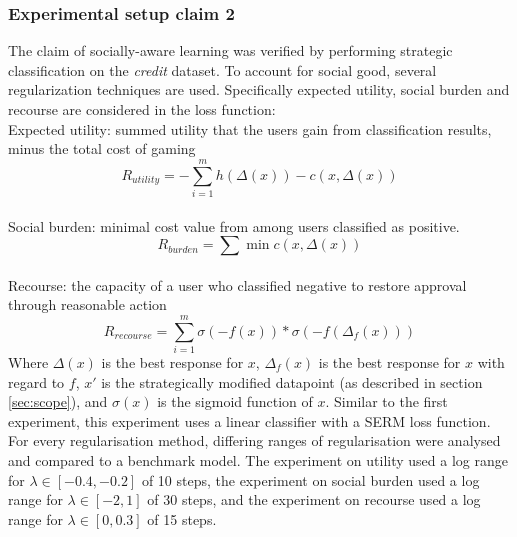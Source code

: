 \subsubsection{Experimental setup claim 2} 
The claim of socially-aware learning was verified by performing strategic classification on the \textit{credit} dataset. To account for social good, several regularization techniques are used. Specifically expected utility, social burden and recourse are considered in the loss function:\\

Expected utility: summed utility that the users gain from classification results, minus the total cost of gaming
\begin{equation}\label{eq:r_util}
     R_{utility} = -\sum^m_{i=1} h(\Delta(x)) - c(x,\Delta(x))
\end{equation}\\
Social burden: minimal cost value from among users classified as positive.
\begin{equation}\label{eq:r_burden}
    R_{burden} = \sum \min c(x,\Delta(x)) %
\end{equation}
\\
Recourse: the capacity of a user who classified negative to restore approval through reasonable action
\begin{equation}\label{eq:r_recourse}
    R_{recourse} = \sum^m_{i=1}\sigma(-f(x)) * \sigma(-f(\Delta_f(x)))
\end{equation}
Where $\Delta(x)$ is the best response for $x$, $\Delta_f(x)$ is the best response for $x$ with regard to $f$, $x'$ is the strategically modified datapoint (as described in section \ref{sec:scope}), and $\sigma(x)$ is the sigmoid function of $x$.  Similar to the first experiment, this experiment uses a linear classifier with a SERM loss function. For every regularisation method, differing ranges of regularisation were analysed and compared to a benchmark model. The experiment on utility used a log range for $\lambda \in [-0.4,-0.2]$ of 10 steps, the experiment on social burden used a log range for $\lambda \in [-2,1]$ of 30 steps, and the experiment on recourse used a log range for $\lambda \in [0,0.3]$ of 15 steps.

